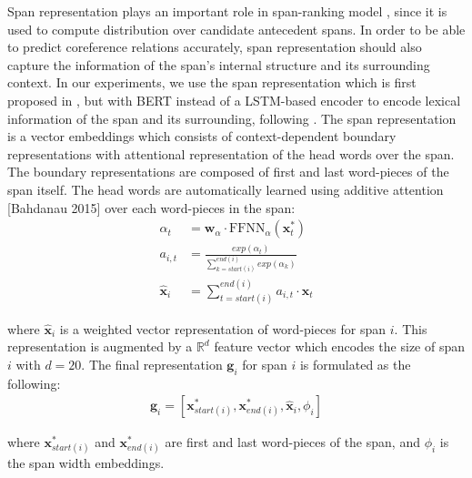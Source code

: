 \documentclass[11pt]{article}
\begin{document}
Span representation plays an important role in span-ranking model \parencite{lee2017end}, since it is used to compute distribution over candidate antecedent spans. In order to be able to predict coreference relations accurately, span representation should also capture the information of the span's internal structure and its surrounding context. In our experiments, we use the span representation which is first proposed in \parencite{lee2017end}, but with BERT \parencite{devlin2019bert} instead of a LSTM-based encoder to encode lexical information of the span and its surrounding, following \parencite{joshi2019coref}. The span representation is a vector embeddings which consists of context-dependent boundary representations with attentional representation of the head words over the span. The boundary representations are composed of first and last word-pieces of the span itself. The head words are automatically learned using additive attention [Bahdanau 2015] over each word-pieces in the span:
\begin{align*}
\alpha_{t} &= \pmb{w}_{\alpha} \cdot \text{FFNN}_{\alpha}(\pmb{x}_{t}^{*}) \\ 
a_{i,t} &=  \frac{exp(\alpha_{t})}{\sum\limits_{k=start(i)}^{end(i)} exp(\alpha_{k})} \\ 
\hat{\pmb{x}}_{i} &= \sum\limits_{t=start(i)}^{end(i)} a_{i,t} \cdot \pmb{x}_{t}
\end{align*}

where $\hat{\pmb{x}}_{i}$ is a weighted vector representation of word-pieces for span $i$. This representation is augmented by a $\mathbb{R}^{d}$ feature vector which encodes the size of span $i$ with $d = 20$. The final representation $\pmb{g}_{i}$ for span $i$ is formulated as the following:
\begin{align*}
\pmb{g}_{i} = [\pmb{x}_{start(i)}^{*}, \pmb{x}_{end(i)}^{*}, \hat{\pmb{x}}_{i}, \phi_{i}]
\end{align*}  

where $\pmb{x}_{start(i)}^{*}$ and $\pmb{x}_{end(i)}^{*}$ are first and last word-pieces of the span, and $\phi_{i}$ is the span width embeddings.

\end{document}
